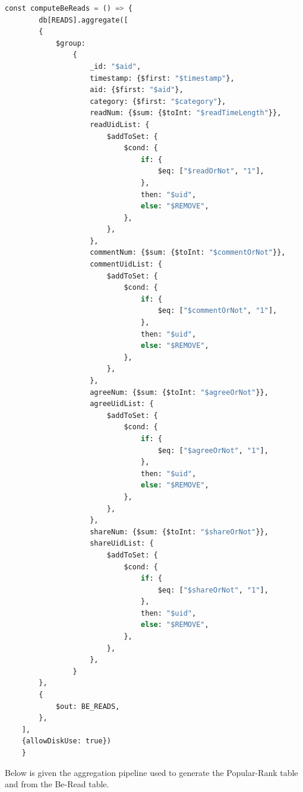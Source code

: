 \documentclass{report}
\begin{document}
    \begin{lstlisting}[language=python, caption=Aggregation pipeline for generating Be-Read table]
    const computeBeReads = () => {
        db[READS].aggregate([
        {
            $group:
                {
                    _id: "$aid",
                    timestamp: {$first: "$timestamp"},
                    aid: {$first: "$aid"},
                    category: {$first: "$category"},
                    readNum: {$sum: {$toInt: "$readTimeLength"}},
                    readUidList: {
                        $addToSet: {
                            $cond: {
                                if: {
                                    $eq: ["$readOrNot", "1"],
                                },
                                then: "$uid",
                                else: "$REMOVE",
                            },
                        },
                    },
                    commentNum: {$sum: {$toInt: "$commentOrNot"}},
                    commentUidList: {
                        $addToSet: {
                            $cond: {
                                if: {
                                    $eq: ["$commentOrNot", "1"],
                                },
                                then: "$uid",
                                else: "$REMOVE",
                            },
                        },
                    },
                    agreeNum: {$sum: {$toInt: "$agreeOrNot"}},
                    agreeUidList: {
                        $addToSet: {
                            $cond: {
                                if: {
                                    $eq: ["$agreeOrNot", "1"],
                                },
                                then: "$uid",
                                else: "$REMOVE",
                            },
                        },
                    },
                    shareNum: {$sum: {$toInt: "$shareOrNot"}},
                    shareUidList: {
                        $addToSet: {
                            $cond: {
                                if: {
                                    $eq: ["$shareOrNot", "1"],
                                },
                                then: "$uid",
                                else: "$REMOVE",
                            },
                        },
                    },
                }
        },
        {
            $out: BE_READS,
        },
    ],
    {allowDiskUse: true})
    }
    \end{lstlisting}
    Below is given the aggregation pipeline used to generate the Popular-Rank table and from the Be-Read table.
\end{document}
